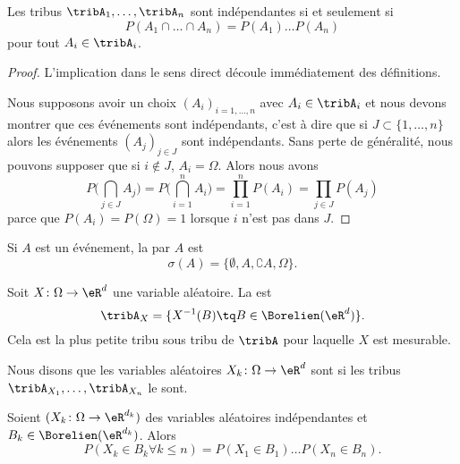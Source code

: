 \begin{lemma}       \label{LemTribIndepProdProb}
    Les tribus \( \tribA_1,\ldots,\tribA_n\) sont indépendantes si et seulement si
    \begin{equation}
        P(A_1\cap\ldots\cap A_n)=P(A_1)\ldots P(A_n)
    \end{equation}
    pour tout \( A_i\in\tribA_i\).
\end{lemma}

\begin{proof}
    L'implication dans le sens direct découle immédiatement des définitions.

    Nous supposons avoir un choix \( (A_i)_{i=1,\ldots,n}\) avec \( A_i\in\tribA_i\) et nous devons montrer que ces événements sont indépendants, c'est à dire que si \( J\subset\{ 1,\ldots,n \}\) alors les événements \( (A_j)_{j\in J}\) sont indépendants. Sans perte de généralité, nous pouvons supposer que si \( i\notin J\), \( A_i=\Omega\). Alors nous avons
    \begin{equation}
        P\big( \bigcap_{j\in J}A_j \big)=P\big( \bigcap_{i=1}^nA_i \big)=\prod_{i=1}^nP(A_i)=\prod_{j\in J}P(A_j)
    \end{equation}
    parce que \( P(A_i)=P(\Omega)=1\) lorsque \( i\) n'est pas dans \( J\).
\end{proof}

Si \( A\) est un événement, la  par \( A\) est
\begin{equation}
    \sigma(A)=\{ \emptyset,A,\complement A,\Omega \}.
\end{equation}

Soit \( X\colon \Omega\to \eR^d\) une variable aléatoire. La  est
\begin{equation}
    \tribA_X=\{ X^{-1}(B)\tq B\in\Borelien(\eR^d) \}.
\end{equation}
Cela est la plus petite tribu sous tribu de \( \tribA\) pour laquelle \( X\) est mesurable.


Nous disons que les variables aléatoires \( X_k\colon \Omega\to \eR^d\) sont  si les tribus \( \tribA_{X_1},\ldots,\tribA_{X_n}\) le sont.

\begin{proposition}
    Soient \( (X_k\colon \Omega\to \eR^{d_k})\) des variables aléatoires indépendantes et \( B_k\in \Borelien(\eR^{d_k})\). Alors
    \begin{equation}
        P(X_k\in B_k\forall k\leq n)=P(X_1\in B_1)\ldots P(X_n\in B_n).
    \end{equation}
\end{proposition}

